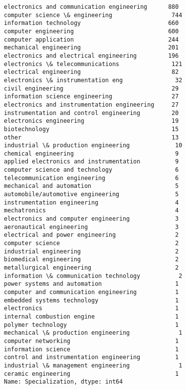 \documentclass[11pt]{article}
\makeatletter
\newcommand{\boxspacing}{\kern\kvtcb@left@rule\kern\kvtcb@boxsep}
\newcommand{\prompt}[4]{
        \ttfamily\llap{{\color{#2}[#3]:\hspace{3pt}#4}}\vspace{-\baselineskip}
    }
\makeatother
\begin{document}
            \begin{tcolorbox}[breakable, size=fbox, boxrule=.5pt, pad at break*=1mm, opacityfill=0]
\prompt{Out}{outcolor}{10}{\boxspacing}
\begin{Verbatim}[commandchars=\\\{\}]
electronics and communication engineering      880
computer science \& engineering                 744
information technology                         660
computer engineering                           600
computer application                           244
mechanical engineering                         201
electronics and electrical engineering         196
electronics \& telecommunications               121
electrical engineering                          82
electronics \& instrumentation eng               32
civil engineering                               29
information science engineering                 27
electronics and instrumentation engineering     27
instrumentation and control engineering         20
electronics engineering                         19
biotechnology                                   15
other                                           13
industrial \& production engineering             10
chemical engineering                             9
applied electronics and instrumentation          9
computer science and technology                  6
telecommunication engineering                    6
mechanical and automation                        5
automobile/automotive engineering                5
instrumentation engineering                      4
mechatronics                                     4
electronics and computer engineering             3
aeronautical engineering                         3
electrical and power engineering                 2
computer science                                 2
industrial engineering                           2
biomedical engineering                           2
metallurgical engineering                        2
information \& communication technology           2
power systems and automation                     1
computer and communication engineering           1
embedded systems technology                      1
electronics                                      1
internal combustion engine                       1
polymer technology                               1
mechanical \& production engineering              1
computer networking                              1
information science                              1
control and instrumentation engineering          1
industrial \& management engineering              1
ceramic engineering                              1
Name: Specialization, dtype: int64
\end{Verbatim}
\end{tcolorbox}
        
\end{document}
